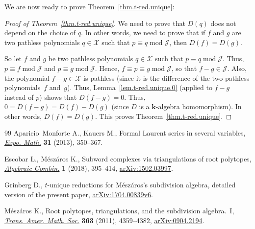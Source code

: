 \documentclass[11pt]{article}
\numberwithin{equation}{section}
\begin{document}
We are now ready to prove Theorem~\ref{thm.t-red.unique}:

\begin{proof}[Proof of Theorem~\ref{thm.t-red.unique}]We need to prove that $D ( q) $ does not depend on the choice of $q$. In other words, we need to prove that if $f$ and $g$ are two pathless polynomials $q\in\mathcal{X}$ such that $p\equiv q\operatorname{mod}\mathcal{J}$, then $D(f) =D(g) $.

So let $f$ and $g$ be two pathless polynomials $q\in\mathcal{X}$ such that $p\equiv q\operatorname{mod}\mathcal{J}$. Thus, $p\equiv f\operatorname{mod} \mathcal{J}$ and $p\equiv g\operatorname{mod}\mathcal{J}$. Hence, $f\equiv p\equiv g\operatorname{mod}\mathcal{J}$, so that $f-g\in\mathcal{J}$. Also, the polynomial $f-g\in\mathcal{X}$ is pathless (since it is the difference of the two pathless polynomials~$f$ and~$g$). Thus, Lemma~\ref{lem.t-red.unique.0} (applied to $f-g$ instead of $p$) shows that $D(f-g) =0$. Thus, $0=D(f-g) =D(f) -D(g) $ (since $D$ is a $\mathbf{k}$-algebra homomorphism). In other words, $D(f) =D(g) $. This proves
Theorem~\ref{thm.t-red.unique}.
\end{proof}
\begin{thebibliography}{99}
Aparicio~Monforte A., Kauers M., Formal {L}aurent series in several variables,
 \href{https://doi.org/10.1016/j.exmath.2013.01.004}{\textit{Expo. Math.}} \textbf{31} (2013), 350--367.

Escobar L., M\'{e}sz\'{a}ros K., Subword complexes via triangulations of root
 polytopes, \href{https://doi.org/10.5802/alco.17}{\textit{Algebraic Combin.}} \textbf{1} (2018), 395--414,
 \href{https://arxiv.org/abs/1502.03997}{arXiv:1502.03997}.

Grinberg D., $t$-unique reductions for {M}\'{e}sz\'{a}ros's subdivision
 algebra, {d}etailed version of the present paper, \href{https://arxiv.org/abs/1704.00839v6}{arXiv:1704.00839v6}.

M\'esz\'aros K., Root polytopes, triangulations, and the subdivision
 algebra.~{I}, \href{https://doi.org/10.1090/S0002-9947-2011-05265-7}{\textit{Trans. Amer. Math. Soc.}} \textbf{363} (2011),
 4359--4382, \href{https://arxiv.org/abs/0904.2194}{arXiv:0904.2194}.

\end{thebibliography}
\end{document}
